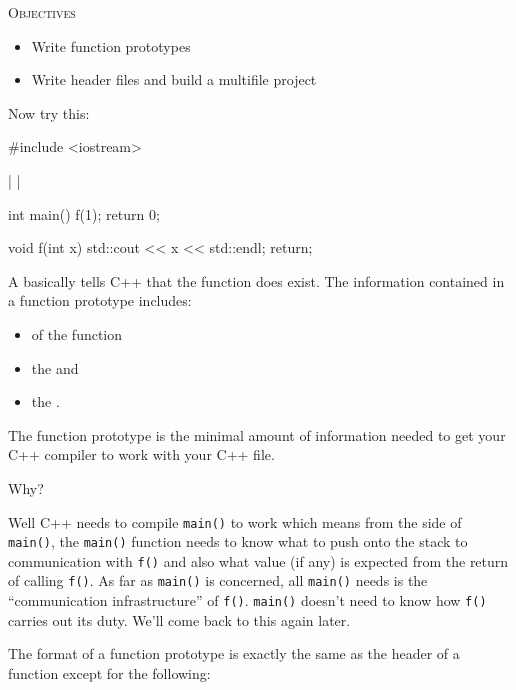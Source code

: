\newpage{}

\textsc{Objectives}
\begin{itemize}
\item Write function prototypes
\item Write header files and build a multifile project
\end{itemize}

\newpage{}


Now try this:

\begin{consolethree}[escapeinside=||]
#include <iostream>

| |

int main()
{
    f(1);
    return 0;
}

void f(int x)
{
    std::cout << x << std::endl;
    return;
}
\end{consolethree}
A  basically tells C++ that the function does exist. The information contained in a function prototype includes:

\begin{itemize}
\item {} of the function
\item the  and
\item the .
\end{itemize}

The function prototype is the minimal amount of information needed to get your C++ compiler to work with your C++ file.

Why?

Well C++ needs to compile \texttt{main()} to work which means from the side of \texttt{main()}, the \texttt{main()} function needs to know what to push onto the stack to communication with \texttt{f()} and also what value (if any) is expected from the return of calling \texttt{f()}. As far as \texttt{main()} is concerned, all \texttt{main()} needs is the ``communication infrastructure'' of \texttt{f()}. \texttt{main()} doesn't need to know how \texttt{f()} carries out its duty. We'll come back to this again later.

The format of a function prototype is exactly the same as the header of a function except for the following:

